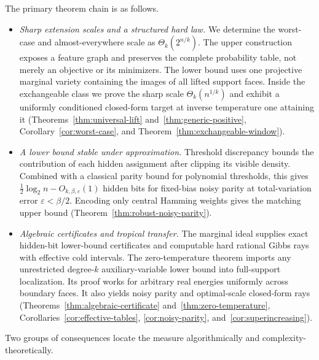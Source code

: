 \documentclass{article}
\begin{document}
The primary theorem chain is as follows.
\begin{itemize}
  \item \emph{Sharp extension scales and a structured hard law.}
  We determine the worst-case and almost-everywhere scale as
  $\Theta_k(2^{n/k})$.  The upper construction exposes a feature graph and
  preserves the complete probability table, not merely an objective or its
  minimizers.  The lower bound uses one projective marginal variety containing
  the images of all lifted support faces.  Inside the exchangeable class we
  prove the sharp scale $\Theta_k(n^{1/k})$ and exhibit a uniformly
  conditioned closed-form target at inverse temperature one attaining it
  (Theorems~\ref{thm:universal-lift} and~\ref{thm:generic-positive},
  Corollary~\ref{cor:worst-case}, and
  Theorem~\ref{thm:exchangeable-window}).
  \item \emph{A lower bound stable under approximation.}
  Threshold discrepancy bounds the contribution of each hidden assignment
  after clipping its visible density.  Combined with a classical parity
  bound for polynomial thresholds, this gives
  $\frac12\log_2 n-O_{k,\beta,\varepsilon}(1)$ hidden bits for fixed-bias
  noisy parity at total-variation error $\varepsilon<\beta/2$.
  Encoding only central Hamming weights gives the matching upper bound
  (Theorem~\ref{thm:robust-noisy-parity}).
  \item \emph{Algebraic certificates and tropical transfer.}
  The marginal ideal supplies exact hidden-bit lower-bound certificates and
  computable hard rational Gibbs rays with effective cold intervals.  The
  zero-temperature theorem imports any unrestricted
  degree-$k$ auxiliary-variable lower bound into full-support localization.
  Its proof works for arbitrary real energies uniformly across boundary faces.
  It also yields noisy parity and optimal-scale closed-form rays
  (Theorems~\ref{thm:algebraic-certificate} and~\ref{thm:zero-temperature},
  Corollaries~\ref{cor:effective-tables}, \ref{cor:noisy-parity},
  and~\ref{cor:superincreasing}).
\end{itemize}
Two groups of consequences locate the measure algorithmically and
complexity-theoretically.
\end{document}
